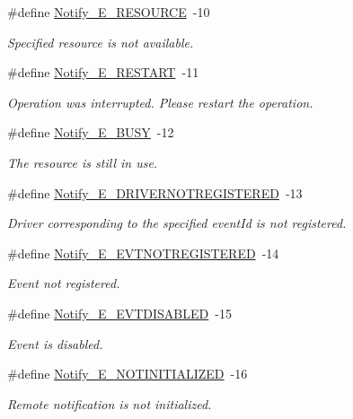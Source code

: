 \begin{DoxyCompactItemize}
\#define \hyperlink{_notify_8h_aa4f6f673a3eb54bdcd65d1cefccb29e7}{Notify\_\-E\_\-RESOURCE}~-\/10
\begin{DoxyCompactList}\small\item\em Specified resource is not available. \item\end{DoxyCompactList}\item 
\#define \hyperlink{_notify_8h_a281da75d439e60a04a400bffdaf6c4f6}{Notify\_\-E\_\-RESTART}~-\/11
\begin{DoxyCompactList}\small\item\em Operation was interrupted. Please restart the operation. \item\end{DoxyCompactList}\item 
\#define \hyperlink{_notify_8h_a21bc6c23823d736fb2589664d876d942}{Notify\_\-E\_\-BUSY}~-\/12
\begin{DoxyCompactList}\small\item\em The resource is still in use. \item\end{DoxyCompactList}\item 
\#define \hyperlink{_notify_8h_a545952549555e51f9e79011dc809c07c}{Notify\_\-E\_\-DRIVERNOTREGISTERED}~-\/13
\begin{DoxyCompactList}\small\item\em Driver corresponding to the specified eventId is not registered. \item\end{DoxyCompactList}\item 
\#define \hyperlink{_notify_8h_ad9030d9269afff260cba4971288ea06d}{Notify\_\-E\_\-EVTNOTREGISTERED}~-\/14
\begin{DoxyCompactList}\small\item\em Event not registered. \item\end{DoxyCompactList}\item 
\#define \hyperlink{_notify_8h_a5f7397fead455e8973aff576329edeec}{Notify\_\-E\_\-EVTDISABLED}~-\/15
\begin{DoxyCompactList}\small\item\em Event is disabled. \item\end{DoxyCompactList}\item 
\#define \hyperlink{_notify_8h_a78efd69afedc82d2912adb9f668c2c54}{Notify\_\-E\_\-NOTINITIALIZED}~-\/16
\begin{DoxyCompactList}\small\item\em Remote notification is not initialized. \item\end{DoxyCompactList}\item 

\end{DoxyCompactItemize}
